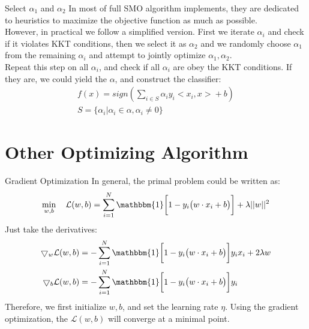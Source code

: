 \documentclass{beamer}
\begin{document}
\begin{frame}{Select $\alpha_1$ and $\alpha_2$}
    In most of full SMO algorithm implements, they are dedicated to heuristics to maximize the objective function as much as possible. \\ 
    However, in practical we follow a simplified version. First we iterate $\alpha_i$ and check if it violates KKT conditions, then we select it as $\alpha_2$ and we randomly choose $\alpha_1$ from the remaining $\alpha_i$ and attempt to jointly optimize $\alpha_1, \alpha_2$. \\
    Repeat this step on all $\alpha_i$, and check if all $\alpha_i$ are obey the KKT conditions. If they are, we could yield the $\alpha$, and construct the classifier:
    \begin{gather*}
        f(x) = sign(\sum_{i \in S} \alpha_i y_i \bigl< x_i,x \bigr> + b) \\
        S = \{\alpha_i | \alpha_i \in \alpha, \alpha_i \neq 0\}
    \end{gather*}
\end{frame}

\section{Other Optimizing Algorithm}
\begin{frame}{Gradient Optimization}
    In general, the primal problem could be written as:
    \begin{gather*}
        \min_{w, b} \quad \mathcal{L}(w, b) = \sum_{i=1}^N \mathbbm{1}\biggl[ 1 - y_i \bigl( w \cdot x_i + b\bigr) \biggr] + \lambda || w ||^2
    \end{gather*}
    Just take the derivatives:
    \begin{align*}
        \bigtriangledown_{w} \mathcal{L}(w, b) &= - \sum_{i=1}^N \mathbbm{1}\biggl[ 1 - y_i\bigl(w \cdot x_i + b\bigr) \biggr] y_i x_i + 2 \lambda w \\
        \bigtriangledown_{b} \mathcal{L}(w, b) &= - \sum_{i=1}^N \mathbbm{1}\biggl[ 1 - y_i\bigl(w \cdot x_i + b\bigr) \biggr] y_i
    \end{align*}
    Therefore, we first initialize $w, b$, and set the learning rate $\eta$. Using the gradient optimization, the $\mathcal{L}(w, b)$ will converge at a minimal point.  
\end{frame}
\end{document}
